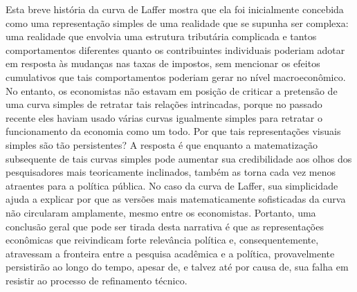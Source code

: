\documentclass[12pt]{article}
\begin{document}
Esta breve história da curva de Laffer mostra que ela foi inicialmente concebida como uma representação simples de uma realidade que se supunha ser complexa: uma realidade que envolvia uma estrutura tributária complicada e tantos comportamentos diferentes quanto os contribuintes individuais poderiam adotar em resposta às mudanças nas taxas de impostos, sem mencionar os efeitos cumulativos que tais comportamentos poderiam gerar no nível macroeconômico. No entanto, os economistas não estavam em posição de criticar a pretensão de uma curva simples de retratar tais relações intrincadas, porque no passado recente eles haviam usado várias curvas igualmente simples para retratar o funcionamento da economia como um todo. Por que tais representações visuais simples são tão persistentes? A resposta é que enquanto a matematização subsequente de tais curvas simples pode aumentar sua credibilidade aos olhos dos pesquisadores mais teoricamente inclinados, também as torna cada vez menos atraentes para a política pública. No caso da curva de Laffer, sua simplicidade ajuda a explicar por que as versões mais matematicamente sofisticadas da curva não circularam amplamente, mesmo entre os economistas. Portanto, uma conclusão geral que pode ser tirada desta narrativa é que as representações econômicas que reivindicam forte relevância política e, consequentemente, atravessam a fronteira entre a pesquisa acadêmica e a política, provavelmente persistirão ao longo do tempo, apesar de, e talvez até por causa de, sua falha em resistir ao processo de refinamento técnico.
\end{document}
